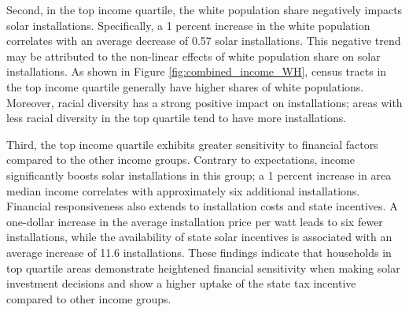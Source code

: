 \documentclass[11pt,twoside,letterpaper]{article}
\begin{document}
Second, in the top income quartile, the white population share negatively impacts solar installations. Specifically, a 1 percent increase in the white population correlates with an average decrease of 0.57 solar installations. This negative trend may be attributed to the non-linear effects of white population share on solar installations. As shown in Figure \ref{fig:combined_income_WH}, census tracts in the top income quartile generally have higher shares of white populations. Moreover, racial diversity has a strong positive impact on installations; areas with less racial diversity in the top quartile tend to have more installations.

Third, the top income quartile exhibits greater sensitivity to financial factors compared to the other income groups. Contrary to expectations, income significantly boosts solar installations in this group; a 1 percent increase in area median income correlates with approximately six additional installations. Financial responsiveness also extends to installation costs and state incentives. A one-dollar increase in the average installation price per watt leads to six fewer installations, while the availability of state solar incentives is associated with an average increase of 11.6 installations. These findings indicate that households in top quartile areas demonstrate heightened financial sensitivity when making solar investment decisions and show a higher uptake of the state tax incentive compared to other income groups.



\end{document}
